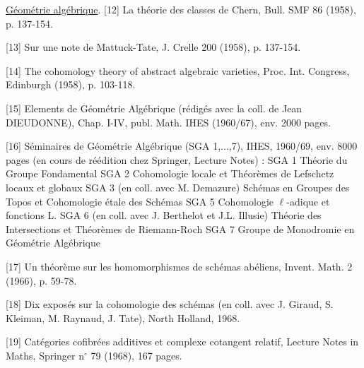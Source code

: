 
\uline{Géométrie algébrique}.
[12] La théorie des classes de Chern, Bull. SMF 86
(1958), p. 137-154.

[13] Sur une note de Mattuck-Tate, J. Crelle 200
(1958), p. 137-154.

[14] The cohomology theory of abstract algebraic
varieties, Proc. Int. Congress, Edinburgh
(1958), p. 103-118.

[15] Elements de Géométrie Algébrique (rédigés avec
la coll. de Jean DIEUDONNE), Chap. I-IV, publ.
Math. IHES (1960/67), env. 2000 pages.

[16] Séminaires de Géométrie Algébrique (SGA 1,...,7),
IHES, 1960/69, env. 8000 pages (en cours de
réédition chez Springer, Lecture Notes) :
SGA 1 Théorie du Groupe Fondamental
SGA 2 Cohomologie locale et Théorèmes de Lefschetz
locaux et globaux
SGA 3 (en coll. avec M. Demazure) Schémas en
Groupes des Topos et Cohomologie étale
des Schémas
SGA 5 Cohomologie $\ell$-adique et fonctions L.
SGA 6 (en coll. avec J. Berthelot et J.L. Illusie)
Théorie des Intersections et Théorèmes de
Riemann-Roch
SGA 7 Groupe de Monodromie en Géométrie Algébrique

[17] Un théorème sur les homomorphismes de schémas
abéliens, Invent. Math. 2 (1966), p. 59-78.

[18] Dix exposés sur la cohomologie des schémas
(en coll. avec J. Giraud, S. Kleiman, M. Raynaud,
J. Tate), North Holland, 1968.

[19] Catégories cofibrées additives et complexe
cotangent relatif, Lecture Notes in Maths,
Springer n$^\circ$ 79 (1968), 167 pages.

